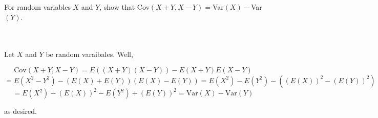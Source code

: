 For random variables $X$ and $Y$, show that Cov$(X+Y, X-Y)=$Var$(X)-$Var$(Y)$.\\\\

\begin{solution}\renewcommand{\qedsymbol}{}\ \\
    Let $X$ and $Y$ be random varaibales. Well,
    
    $$\text{Cov}(X+Y, X-Y)=E((X+Y)(X-Y))-E(X+Y)E(X-Y)$$
    $$=E(X^2-Y^2)-(E(X)+E(Y))(E(X)-E(Y))=E(X^2)-E(Y^2)-((E(X))^2-(E(Y))^2)$$
    $$=E(X^2)-(E(X))^2-E(Y^2)+(E(Y))^2=\text{Var}(X)-\text{Var}(Y)$$
    
    as desired.

\end{solution}